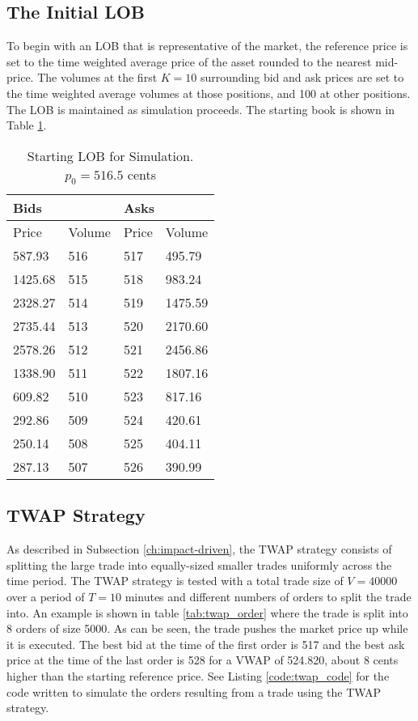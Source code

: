 \subsection{The Initial LOB}
To begin with an LOB that is representative of the market, the reference price is set to the time weighted average price of the asset rounded to the nearest mid-price. The volumes at the first $K=10$ surrounding bid and ask prices are set to the time weighted average volumes at those positions, and 100 at other positions. The LOB is maintained as simulation proceeds. The starting book is shown in Table \ref{tab:starting_LOB}.

\begin{table}[htbp]
\caption{Starting LOB for Simulation. $p_0 = 516.5$ cents} \label{tab:starting_LOB}
\begin{center}
\begin{tabular}{ll|ll}
\hline \hline
\multicolumn{2}{l|}{\textbf{Bids}} & \multicolumn{2}{l}{\textbf{Asks}} \\
\hline
Price        & Volume    & Price      & Volume      \\
\hline
587.93       & 516       & 517        & 495.79      \\
1425.68      & 515       & 518        & 983.24      \\
2328.27      & 514       & 519        & 1475.59     \\
2735.44      & 513       & 520        & 2170.60     \\
2578.26      & 512       & 521        & 2456.86     \\
1338.90      & 511       & 522        & 1807.16     \\
609.82       & 510       & 523        & 817.16      \\
292.86       & 509       & 524        & 420.61      \\
250.14       & 508       & 525        & 404.11      \\
287.13       & 507       & 526        & 390.99             
\end{tabular}
\end{center}
\end{table}

\subsection{TWAP Strategy}
As described in Subsection \ref{ch:impact-driven}, the TWAP strategy consists of splitting the large trade into equally-sized smaller trades uniformly across the time period. The TWAP strategy is tested with a total trade size of $V = 40000$ over a period of $T = 10$ minutes and different numbers of orders to split the trade into.  An example is shown in table \ref{tab:twap_order} where the trade is split into 8 orders of size 5000. As can be seen, the trade pushes the market price up while it is executed. The best bid at the time of the first order is 517 and the best ask price at the time of the last order is 528 for a VWAP of 524.820, about 8 cents higher than the starting reference price. See Listing \ref{code:twap_code} for the code written to simulate the orders resulting from a trade using the TWAP strategy.


